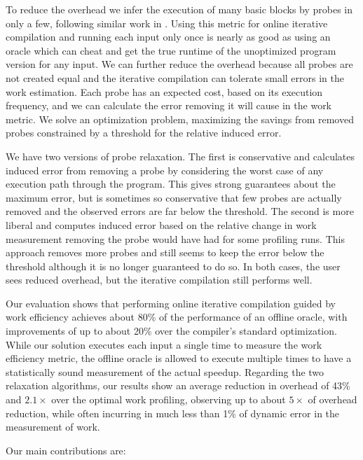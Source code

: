     To reduce the overhead we infer the execution of many basic blocks by probes in only a few, following similar work in
    . Using this metric for online iterative compilation and running each input only once is nearly as good as using an
    oracle which can cheat and get the true runtime of the unoptimized program version for any input. We can further reduce the overhead
    because all probes are not created equal and the iterative compilation can tolerate small errors in the work estimation. Each probe has
    an expected cost, based on its execution frequency, and we can calculate the error removing it will cause in the work metric. We solve
    an optimization problem, maximizing the savings from removed probes constrained by a threshold for the relative induced error.

    We have two versions of probe relaxation. The first is conservative and calculates induced error from removing a probe by considering
    the worst case of any execution path through the program. This gives strong guarantees about the maximum error, but is sometimes so
    conservative that few probes are actually removed and the observed errors are far below the threshold. The second is more liberal and
    computes induced error based on the relative change in work measurement removing the probe would have had for some profiling runs. This
    approach removes more probes and still seems to keep the error below the threshold although it is no longer guaranteed to do so. In
    both cases, the user sees reduced overhead, but the iterative compilation still performs well.
    
    Our evaluation shows that performing online iterative compilation guided by work efficiency achieves about 80\% of the performance of
    an offline oracle, with improvements of up to about 20\% over the compiler's standard optimization. While our solution executes each
    input a single time to measure the work efficiency metric, the offline oracle is allowed to execute multiple times to have a
    statistically sound measurement of the actual speedup. Regarding the two relaxation algorithms, our results show an average reduction
    in overhead of 43\% and $2.1\times$ over the optimal work profiling, observing up to about $5\times$ of overhead reduction, while often
    incurring in much less than 1\% of dynamic error in the measurement of work.
    
    Our main contributions are:

